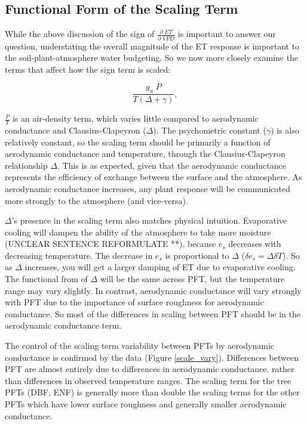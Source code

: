 \documentclass[draft,linenumbers]{gcbjournal}
\begin{document}
\subsection{Functional Form of the Scaling Term}
\label{scale_term}
While the above discussion of the sign of $\frac{\partial \; ET}{\partial \; VPD}$ is important to answer our question, understating the overall magnitude of the ET response is important to the soil-plant-atmosphere water budgeting. So we now more closely examine the terms that affect how the sign term is scaled:

\begin{equation}
  \frac{g_a \; P}{T(\Delta + \gamma)},
\end{equation}

$\frac{P}{T}$ is an air-density term, which varies little compared to aerodynamic conductance and Clausius-Clapeyron ($\Delta$). The psychometric constant ($\gamma$) is also relatively constant, so the scaling term should be primarily a function of aerodynamic conductance and temperature, through the Clausius-Clapeyron relationship $\Delta$. This is as expected, given that the aerodynamic conductance represents the efficiency of exchange between the surface and the atmosphere. As aerodynamic conductance  increases, any plant response will be communicated more strongly to the atmosphere (and vice-versa).

$\Delta$'s presence in the scaling term also matches physical intuition. Evaporative cooling will dampen the ability of the atmosphere to take more moisture (UNCLEAR SENTENCE REFORMULATE **), because $e_{s}$ decreases with decreasing temperature. The decrease in $e_{s}$ is proportional to $\Delta$ ($\delta e_{s} = \Delta \delta T$). So as $\Delta$ increases, you will get a larger damping of ET due to evaporative cooling. The functional from of $\Delta$ will be the same across PFT, but the temperature range may vary slightly. In contrast, aerodynamic conductance will vary strongly with PFT due to the importance of surface roughness for aerodynamic conductance. So most of the differences in scaling between PFT should be in the aerodynamic conductance term. 

The control of the scaling term variability between PFTs by aerodynamic conductance is confirmed by the data (Figure \ref{scale_vary}). Differences between PFT are almost entirely due to differences in aerodynamic conductance, rather than differences in observed temperature ranges. The scaling term for the tree PFTs (DBF, ENF) is generally more than double the scaling terms for the other PFTs which have lower surface roughness and generally smaller aerodynamic conductance.
\end{document}
